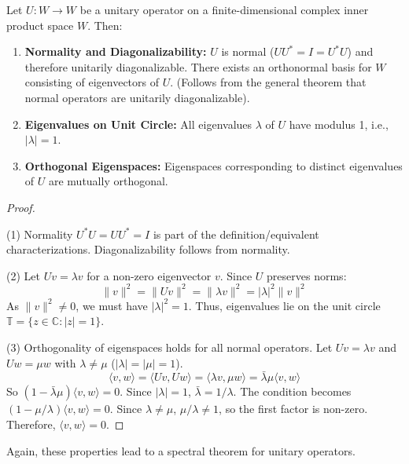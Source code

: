 \begin{theorem}
\label{thm:unitary_props}
Let $U: W \to W$ be a unitary operator on a finite-dimensional complex inner product space $W$. Then:
\begin{enumerate}
    \item \textbf{Normality and Diagonalizability:} $U$ is normal ($UU^* = I = U^*U$) and therefore unitarily diagonalizable. There exists an orthonormal basis for $W$ consisting of eigenvectors of $U$. (Follows from the general theorem that normal operators are unitarily diagonalizable).
    \item \textbf{Eigenvalues on Unit Circle:} All eigenvalues $\lambda$ of $U$ have modulus 1, i.e., $|\lambda| = 1$.
    \item \textbf{Orthogonal Eigenspaces:} Eigenspaces corresponding to distinct eigenvalues of $U$ are mutually orthogonal.
\end{enumerate}
\end{theorem}
\begin{proof}
\, 

(1) Normality $U^*U = UU^* = I$ is part of the definition/equivalent characterizations. Diagonalizability follows from normality.

(2) Let $Uv = \lambda v$ for a non-zero eigenvector $v$. Since $U$ preserves norms:
    \[ \|v\|^2 = \|Uv\|^2 = \|\lambda v\|^2 = |\lambda|^2 \|v\|^2 \]
    As $\|v\|^2 \neq 0$, we must have $|\lambda|^2 = 1$. Thus, eigenvalues lie on the unit circle $\mathbb{T} = \{ z \in \mathbb{C} : |z| = 1 \}$.

(3) Orthogonality of eigenspaces holds for all normal operators. Let $Uv = \lambda v$ and $Uw = \mu w$ with $\lambda \neq \mu$ ($|\lambda|=|\mu|=1$).
    \[ \langle v, w \rangle = \langle Uv, Uw \rangle = \langle \lambda v, \mu w \rangle = \bar{\lambda} \mu \langle v, w \rangle \]
    So $(1 - \bar{\lambda}\mu) \langle v, w \rangle = 0$. Since $|\lambda|=1$, $\bar{\lambda} = 1/\lambda$. The condition becomes $(1 - \mu/\lambda) \langle v, w \rangle = 0$. Since $\lambda \neq \mu$, $\mu/\lambda \neq 1$, so the first factor is non-zero. Therefore, $\langle v, w \rangle = 0$.
\end{proof}

Again, these properties lead to a spectral theorem for unitary operators.

